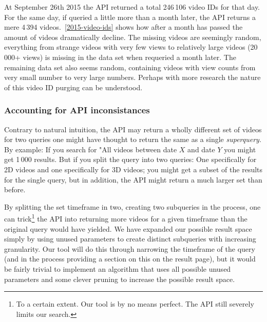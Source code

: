 At September 26th 2015 the API returned a total 246\,106 video IDs for that day.
For the same day, if queried a little more than a month later, the API returns
a mere 4\,394 videos.~\cref{2015-video-ids} shows how after a month has passed 
the amount of videos dramatically decline. The missing videos are seemingly 
random, everything from strange videos with very few views to relatively large 
videos (20\,000+ views) is missing in the data set when requeried a month later. 
The remaining data set also seems random, containing videos with view counts 
from very small number to very large numbers. Perhaps with more research the
nature of this video ID purging can be understood.

\subsubsection{Accounting for API inconsistances}
Contrary to natural intuition, the API may return a wholly different set of
videos for two queries one might have thought to return the same as a single
\textit{superquery}. By example: If you search for "All videos between date
$X$ and date $Y$ you might get 1\,000 results. But if you split the query into
two queries: One specifically for 2D videos and one specifically for 3D videos;
you might get a subset of the results for the single query, but in addition,
the API might return a much larger set than before.

By splitting the set timeframe in two, creating two subqueries in the process,
one can trick\footnote{To a certain extent. Our tool is by no means perfect. The
API still severely limits our search.} the API into returning more videos for a given
timeframe than the original query would have yielded. We have expanded our
possible result space simply by using unused parameters to create distinct
subqueries with increasing granularity.
Our tool will do this through narrowing the timeframe of the query (and
in the process providing a section on this on the result page), but
it would be fairly trivial to implement an algorithm that uses all possible
unused parameters and some clever pruning to increase the possible result space.

